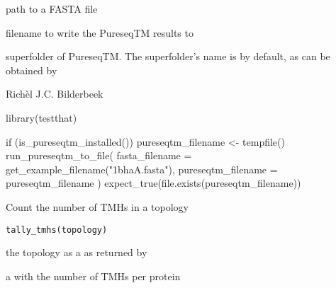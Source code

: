 \documentclass[letterpaper]{book}
\begin{document}
%
\begin{Arguments}
\begin{ldescription}
\item[\code{fasta\_filename}] path to a FASTA file

\item[\code{pureseqtm\_filename}] filename to write the PureseqTM results to

\item[\code{folder\_name}] superfolder of PureseqTM.
The superfolder's name is 
by default, as can be obtained by
\end{ldescription}
\end{Arguments}
%
\begin{Author}\relax
Richèl J.C. Bilderbeek
\end{Author}
%
\begin{Examples}
\begin{ExampleCode}
library(testthat)

if (is_pureseqtm_installed()) {
  pureseqtm_filename <- tempfile()
  run_pureseqtm_to_file(
    fasta_filename = get_example_filename("1bhaA.fasta"),
    pureseqtm_filename = pureseqtm_filename
  )
  expect_true(file.exists(pureseqtm_filename))
}
\end{ExampleCode}
\end{Examples}
%
\begin{Description}\relax
Count the number of TMHs in a topology
\end{Description}
%
\begin{Usage}
\begin{verbatim}
tally_tmhs(topology)
\end{verbatim}
\end{Usage}
%
\begin{Arguments}
\begin{ldescription}
\item[\code{topology}] the topology as a 
as returned by 
\end{ldescription}
\end{Arguments}
%
\begin{Value}
a  with the number of
TMHs per protein
\end{Value}
%
\begin{Examples}
\end{Examples}
\end{document}
